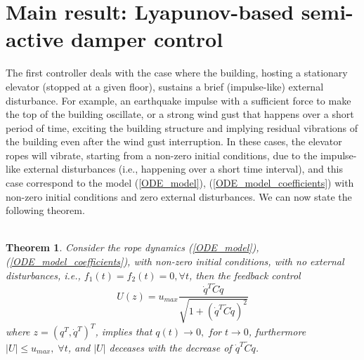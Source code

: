 \documentclass[letterpaper, 11 pt, conference]{ieeeconf}
\newtheorem{thm}{\bf Theorem}
\begin{document}
\section{Main result: Lyapunov-based semi-active damper control}\label{section2}
The first controller deals with the case where the building,
hosting a stationary elevator (stopped at a given floor), sustains
a brief (impulse-like) external disturbance. For example, an
earthquake impulse with a sufficient force to make the top of the
building oscillate, or a strong wind gust that happens over a
short period of time, exciting the building structure and implying
residual vibrations of the building even after the wind gust
interruption. In these cases, the elevator ropes will vibrate,
starting from a non-zero initial conditions, due to the
impulse-like external disturbances (i.e., happening over a short
time interval), and this case correspond to the model
(\ref{ODE_model}), (\ref{ODE_model_coefficients}) with non-zero
initial conditions and zero external disturbances. We can now
state the following
theorem.\\\\
 \begin{thm}
Consider the rope dynamics (\ref{ODE_model}),
(\ref{ODE_model_coefficients}), with non-zero initial conditions,
with no external disturbances, i.e., $f_{1}(t)=f_{2}(t)=0,\forall
t$, then the feedback control
\begin{equation}\label{control_1_t}
U(z)=u_{max}\frac{\dot{q}^{T}\tilde{C}\dot{q}
}{\sqrt{1+(\dot{q}^{T}\tilde{C}\dot{q})^{2}}}
\end{equation}
where $z=(q^{T},\dot{q}^{T})^{T}$, implies that $q(t)\rightarrow
0,\;for\; t\rightarrow 0$, furthermore $|U|\leq u_{max},\;\forall
t$, and $|U|$ deceases with the decrease of $\dot{q}^{T}\tilde{C} \dot{q}$.\\\\
\end{thm}
\end{document}
